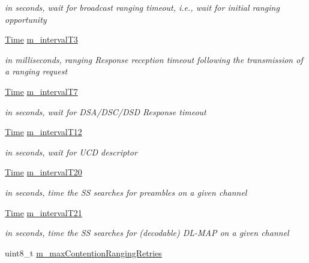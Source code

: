 \begin{DoxyCompactItemize}
\begin{DoxyCompactList}\small\item\em in seconds, wait for broadcast ranging timeout, i.\+e., wait for initial ranging opportunity \end{DoxyCompactList}\item 
\hyperlink{classns3_1_1Time}{Time} \hyperlink{classns3_1_1SubscriberStationNetDevice_acdf9ce2c9f951c3c8433e36f48058d86}{m\+\_\+interval\+T3}
\begin{DoxyCompactList}\small\item\em in milliseconds, ranging Response reception timeout following the transmission of a ranging request \end{DoxyCompactList}\item 
\hyperlink{classns3_1_1Time}{Time} \hyperlink{classns3_1_1SubscriberStationNetDevice_afa2eaee4151fb1ddbfa95394ac7ae662}{m\+\_\+interval\+T7}
\begin{DoxyCompactList}\small\item\em in seconds, wait for D\+S\+A/\+D\+S\+C/\+D\+SD Response timeout \end{DoxyCompactList}\item 
\hyperlink{classns3_1_1Time}{Time} \hyperlink{classns3_1_1SubscriberStationNetDevice_abd4606ca817aac181dc06966881c3571}{m\+\_\+interval\+T12}
\begin{DoxyCompactList}\small\item\em in seconds, wait for U\+CD descriptor \end{DoxyCompactList}\item 
\hyperlink{classns3_1_1Time}{Time} \hyperlink{classns3_1_1SubscriberStationNetDevice_a61ceb1f7700107f6de7200ef2c2b5aec}{m\+\_\+interval\+T20}
\begin{DoxyCompactList}\small\item\em in seconds, time the SS searches for preambles on a given channel \end{DoxyCompactList}\item 
\hyperlink{classns3_1_1Time}{Time} \hyperlink{classns3_1_1SubscriberStationNetDevice_a417f513119092187ab4dd66875c7e429}{m\+\_\+interval\+T21}
\begin{DoxyCompactList}\small\item\em in seconds, time the SS searches for (decodable) D\+L-\/\+M\+AP on a given channel \end{DoxyCompactList}\item 
uint8\+\_\+t \hyperlink{classns3_1_1SubscriberStationNetDevice_a7ddc3b67916fb840e9b0d209a65da826}{m\+\_\+max\+Contention\+Ranging\+Retries}

\end{DoxyCompactItemize}
